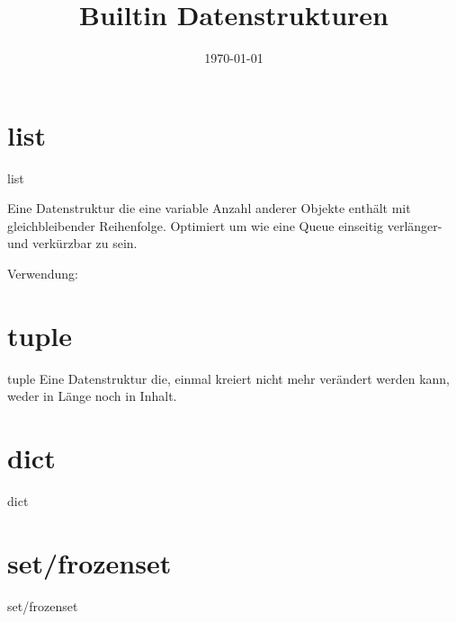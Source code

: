
\newcommand{\topic}{
	Builtin Datenstrukturen
}

\title{\topic}
\supertitle{\course}
\date{\today}



\maketitle

\begin{frame}
	\tableofcontents
\end{frame}

\section{list}
\begin{frame}{list}

Eine Datenstruktur die eine variable Anzahl anderer Objekte enthält mit gleichbleibender Reihenfolge. Optimiert um wie eine Queue einseitig verlänger-und verkürzbar zu sein.

Verwendung:



\end{frame}


\section{tuple}
\begin{frame}{tuple}
Eine Datenstruktur die, einmal kreiert nicht mehr verändert werden kann, weder in Länge noch in Inhalt.
\end{frame}

\section{dict}
\begin{frame}{dict}
\end{frame}

\section{set/frozenset}
\begin{frame}{set/frozenset}
\end{frame}

